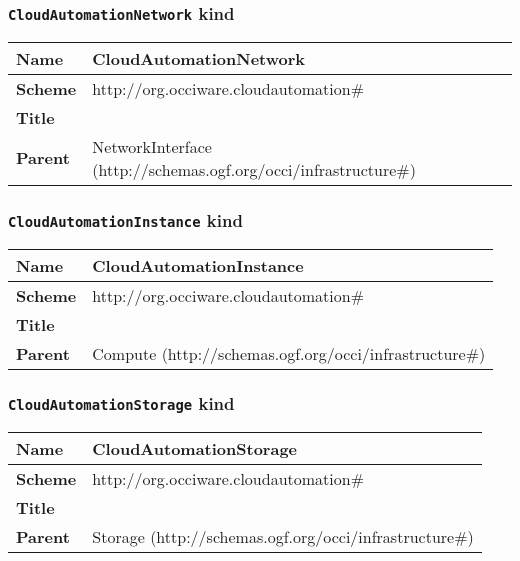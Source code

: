 \subsubsection{\texttt{CloudAutomationNetwork} kind}
\begin{center}
\begin{tabular}{|l|l|}
  \hline
  \textbf{Name} & CloudAutomationNetwork \\
  \hline  
  \textbf{Scheme} & http://org.occiware.cloudautomation\# \\
  \hline
  \textbf{Title} &  \\
  \hline
  \textbf{Parent} & NetworkInterface (http://schemas.ogf.org/occi/infrastructure\#) \\
  \hline
\end{tabular}
\end{center}



\subsubsection{\texttt{CloudAutomationInstance} kind}
\begin{center}
\begin{tabular}{|l|l|}
  \hline
  \textbf{Name} & CloudAutomationInstance \\
  \hline  
  \textbf{Scheme} & http://org.occiware.cloudautomation\# \\
  \hline
  \textbf{Title} &  \\
  \hline
  \textbf{Parent} & Compute (http://schemas.ogf.org/occi/infrastructure\#) \\
  \hline
\end{tabular}
\end{center}



\subsubsection{\texttt{CloudAutomationStorage} kind}
\begin{center}
\begin{tabular}{|l|l|}
  \hline
  \textbf{Name} & CloudAutomationStorage \\
  \hline  
  \textbf{Scheme} & http://org.occiware.cloudautomation\# \\
  \hline
  \textbf{Title} &  \\
  \hline
  \textbf{Parent} & Storage (http://schemas.ogf.org/occi/infrastructure\#) \\
  \hline
\end{tabular}
\end{center}



